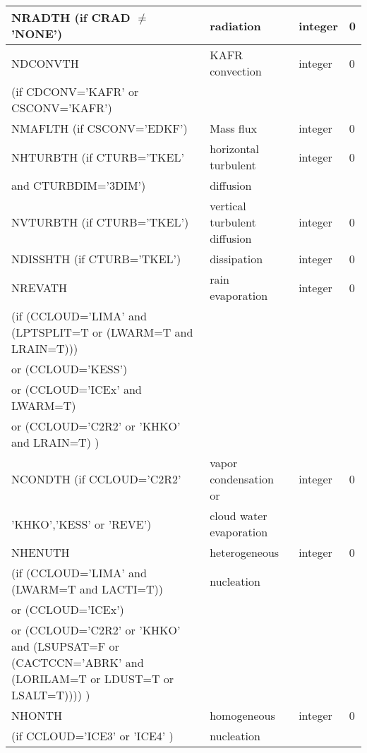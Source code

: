 \begin{longtable} {|p{}|p{}|>{\centering}p{}|p{}<{\centering}|}
NRADTH (if CRAD $\neq$ 'NONE')  & radiation           & integer  &  0 \index{NRADTH!\innam{NAM\_BU\_RTH}}\\\hline
NDCONVTH & KAFR convection          & integer  &  0 \index{NDCONVTH!\innam{NAM\_BU\_RTH}}\\ \nopagebreak
(if CDCONV='KAFR' or CSCONV='KAFR') &  &   &   \\\hline
NMAFLTH (if CSCONV='EDKF') & Mass flux & integer  &  0 \index{NMAFLTH!\innam{NAM\_BU\_RTH}} \\\hline
NHTURBTH (if CTURB='TKEL'& horizontal turbulent & integer  &  0 \index{NHTURBTH!\innam{NAM\_BU\_RTH}}\\ \nopagebreak
and CTURBDIM='3DIM') & diffusion&   &  \\\hline
NVTURBTH (if CTURB='TKEL') & vertical turbulent diffusion & integer  &  0 \index{NVTURBTH!\innam{NAM\_BU\_RTH}}\\\hline
NDISSHTH (if CTURB='TKEL') & dissipation         & integer  &  0 \index{NDISSHTH!\innam{NAM\_BU\_RTH}}\\\hline
NREVATH & rain evaporation    & integer  &  0 \index{NREVATH!\innam{NAM\_BU\_RTH}}\\ \nopagebreak
(if (CCLOUD='LIMA' and (LPTSPLIT=T or (LWARM=T and LRAIN=T))) & & & \\ \nopagebreak
 or (CCLOUD='KESS') & & & \\ \nopagebreak
 or (CCLOUD='ICEx' and LWARM=T) & & & \\ \nopagebreak
 or (CCLOUD='C2R2' or 'KHKO' and LRAIN=T) ) & & & \\ \hline
NCONDTH (if CCLOUD='C2R2'  & vapor condensation  or     & integer  &  0 \index{NCONDTH!\innam{NAM\_BU\_RTH}}\\ \nopagebreak
'KHKO','KESS' or 'REVE')& cloud water  evaporation  &          &    \\\hline
NHENUTH   & heterogeneous  & integer  &  0 \index{NHENUTH!\innam{NAM\_BU\_RTH}}\\ \nopagebreak
(if (CCLOUD='LIMA' and (LWARM=T and LACTI=T)) & nucleation & & \\ \nopagebreak
 or (CCLOUD='ICEx') & & & \\ \nopagebreak
 or (CCLOUD='C2R2' or 'KHKO' and (LSUPSAT=F or (CACTCCN='ABRK' and (LORILAM=T or LDUST=T or LSALT=T)))) ) & & & \\ \hline
NHONTH   & homogeneous  & integer  &  0 \index{NHONTH!\innam{NAM\_BU\_RTH}}\\ \nopagebreak
(if CCLOUD='ICE3' or 'ICE4' ) & nucleation&   &  \\\hline

\end{longtable}
